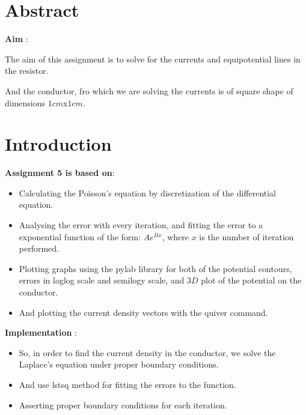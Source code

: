 \documentclass[10pt,english, openany]{book}
\begin{document}
\tableofcontents{}

\mainmatter

\chapter{Abstract}
	\large \textbf{Aim} : \par 
    The aim of this assignment is to solve for the currents and equipotential lines in the resistor.
    \par
    And the conductor, fro which we are solving the currents is of square shape of dimensions $1cm$x$1cm$.
  \par

\begingroup
\let\clearpage\relax
\chapter{Introduction}
\large{\textbf{Assignment 5 is based on}}:\par
\begin{itemize}
\item Calculating the Poisson's equation by discretization of the differential equation.
\item Analysing the error with every iteration, and fitting the error to a exponential function of the form: $Ae^{Bx}$, where $x$ is the number of iteration performed.
\item Plotting graphs using the pylab library for both of the potential contours, errors in loglog scale and semilogy scale, and $3D$ plot of the potential on the conductor.
\item And plotting the current density vectors with the quiver command.
\end{itemize}
   
    \large \textbf{Implementation} :  \par 
\begin{itemize}
\item So, in order to find the current density in the conductor, we solve the Laplace's equation under proper boundary conditions.
\end{itemize}
\begin{itemize}
\item And use lstsq method for fitting the errors to the function.
\item Asserting proper boundary conditions for each iteration.
\end{itemize}
\end{document}
